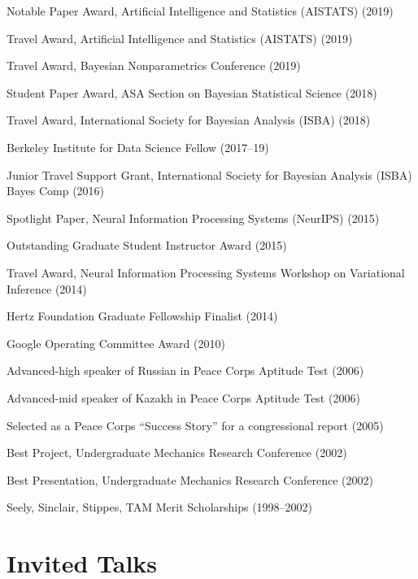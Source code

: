 \documentclass[margin,line]{res}
\newenvironment{list1}{
  \begin{list}{\ding{113}}{%
      \setlength{\itemsep}{0in}
      \setlength{\parsep}{0in} \setlength{\parskip}{0in}
      \setlength{\topsep}{0in} \setlength{\partopsep}{0in}
      \setlength{\leftmargin}{0in}}}{\end{list}} %
\begin{document}
\begin{resume}
\begin{list1}
\item[] Notable Paper Award, Artificial Intelligence and Statistics (AISTATS) (2019)
\item[] Travel Award, Artificial Intelligence and Statistics (AISTATS) (2019)
\item[] Travel Award, Bayesian Nonparametrics Conference (2019)
\item[] Student Paper Award, ASA Section on Bayesian Statistical Science (2018)
\item[] Travel Award, International Society for Bayesian Analysis (ISBA) (2018)
\item[] Berkeley Institute for Data Science Fellow (2017--19)
\item[] Junior Travel Support Grant, International Society for Bayesian Analysis (ISBA) Bayes Comp (2016)
\item[] Spotlight Paper, Neural Information Processing Systems (NeurIPS) (2015)
\item[] Outstanding Graduate Student Instructor Award (2015)
\item[] Travel Award, Neural Information Processing Systems Workshop on Variational Inference (2014)
\item[] Hertz Foundation Graduate Fellowship Finalist (2014)
\item[] Google Operating Committee Award (2010)
\item[] Advanced-high speaker of Russian in Peace Corps Aptitude Test (2006)
\item[] Advanced-mid speaker of Kazakh in Peace Corps Aptitude Test (2006)
\item[] Selected as a Peace Corps ``Success Story'' for a congressional report (2005)
\item[] Best Project, Undergraduate Mechanics Research Conference (2002)
\item[] Best Presentation, Undergraduate Mechanics Research Conference (2002)
\item[] Seely, Sinclair, Stippes, TAM Merit Scholarships (1998--2002)

\end{list1}

\clearpage




\clearpage
\section{\sc Invited Talks}


\end{resume}
\end{document}
